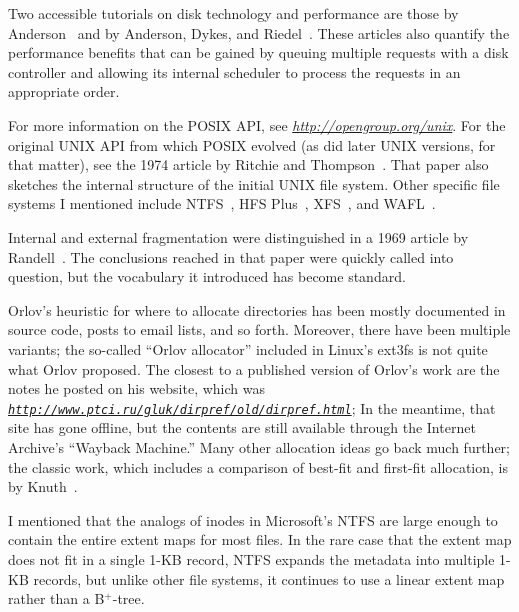 Two accessible tutorials on disk technology and performance are those
by Anderson~\cite{max1118} and by Anderson, Dykes, and
Riedel~\cite{max1119}.  These articles also quantify the performance
benefits that can be gained by queuing multiple requests with a disk
controller and allowing its internal scheduler to process the requests
in an appropriate order.

For more information on the POSIX API, see
\textit{\url{http://opengroup.org/unix}}.  For the original UNIX API from which POSIX
evolved (as did later UNIX versions, for that matter), see the 1974
article by Ritchie and Thompson~\cite{jhs2.3}.  That paper also
sketches the internal structure of the initial UNIX file system.
Other specific file systems I mentioned include NTFS~\cite{max981},
HFS Plus~\cite{max1133}, XFS~\cite{max1110}, and WAFL~\cite{max1115}.

Internal and external fragmentation were distinguished in a 1969
article by Randell~\cite{max1058}.  The conclusions reached in that
paper were quickly called into question, but the vocabulary it
introduced has become standard.

Orlov's heuristic for where to allocate directories has been mostly
documented in source code, posts to email lists, and so forth.
Moreover, there have been multiple variants; the so-called ``Orlov allocator''
included in Linux's ext3fs is not quite what Orlov proposed.  The
closest to a published version of Orlov's work are the notes he posted on
his website, which was \textit{\href{http://web.archive.org/web/20080131082712/http://www.ptci.ru/gluk/dirpref/old/dirpref.html}{\nolinkurl{http://www.ptci.ru/gluk/dirpref/old/dirpref.html}}};
In the meantime, that site has gone offline, but the contents are still
available through the Internet Archive's ``Wayback Machine.''
Many other allocation
ideas go back much further; the classic work, which includes a
comparison of best-fit and first-fit allocation, is by
Knuth~\cite{max1138}.

I mentioned that the analogs of inodes in Microsoft's NTFS are large
enough to contain the entire extent maps for most files.  In the rare
case that the extent map does not fit in a single 1-KB record, NTFS
expands the metadata into multiple 1-KB records, but unlike other file
systems, it continues to use a linear extent map rather than a B$^+$-tree.

